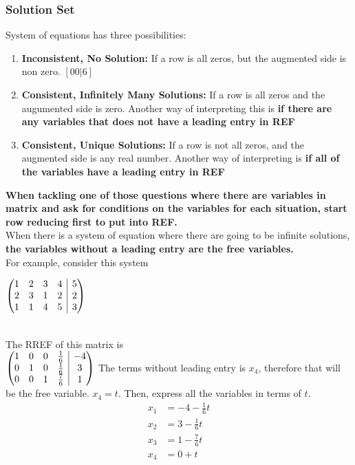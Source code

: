 \documentclass[12pt]{article}
\makeatletter
\newenvironment{amatrix}[1]{%
  \left(\begin{array}{@{}*{#1}{c}|c@{}}
}{%
  \end{array}\right)
}
\makeatother
\begin{document}
\subsubsection{Solution Set}
System of equations has three possibilities:
\begin{enumerate}
\item \textbf{Inconsistent, No Solution:} If a row is all zeros, but the augmented side is non zero. $[0 0|6]$
\item \textbf{Consistent, Infinitely Many Solutions:} If a row is all zeros and the augumented side is zero. Another way of interpreting this is \textbf{if there are any variables that does not have a leading entry in REF}
\item \textbf{Consistent, Unique Solutions:} If a row is not all zeros, and the augmented side is any real number. Another way of interpreting is \textbf{if all of the variables have a leading entry in REF}
\end{enumerate}
\textbf{When tackling one of those questions where there are variables in matrix and ask for conditions on the variables for each situation, start row reducing first to put into REF.}\\
When there is a system of equation where there are going to be infinite solutions, \textbf{the variables without a leading entry are the free variables.}\\
For example, consider this system\\
\begin{centering}
$
\begin{amatrix}{4}
   1 & 2 & 3 &4 &5 \\ 2 & 3 &1 &2 & 2\\1&1&4&5&3\\ 
 \end{amatrix}
$
\end{centering}\\
The RREF of this matrix is\\
$
\begin{amatrix}{4}
   1 & 0 & 0 & \frac{1}{6} &-4 \\ 0 & 1 &0 &\frac{1}{6} & 3\\ 0& 0& 1& \frac{7}{6}& 1\\ 
 \end{amatrix}
$
The terms without leading entry is $x_4$, therefore that will be the free variable. $x_4 = t$.
Then, express all the variables in terms of $t$.\\
\begin{equation}
\begin{split}
x_1 &= -4 - \frac{1}{6}t\\
x_2 &= 3 - \frac{1}{6}t\\
x_3 &= 1-\frac{7}{6}t\\
x_4 &= 0 + t\\
\end{split}
\end{equation}
\end{document}
